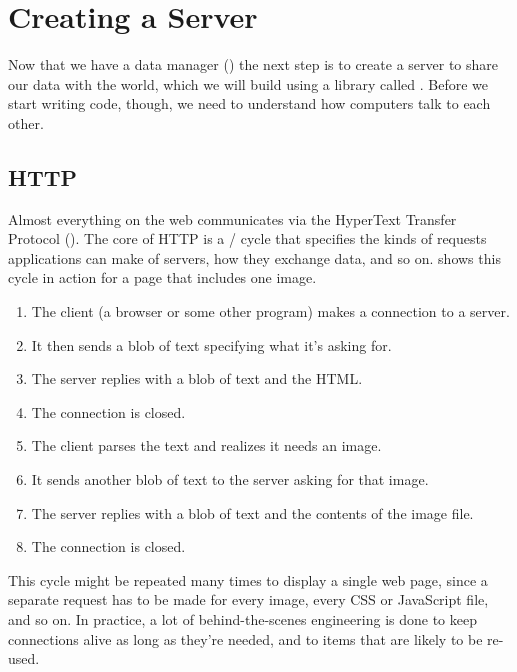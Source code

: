 \chapter{Creating a Server}\label{s:server}

Now that we have a data manager ()
the next step is to create a server to share our data with the world,
which we will build using a library called .
Before we start writing code,
though,
we need to understand how computers talk to each other.

\section{HTTP}\label{s:server-http}

Almost everything on the web communicates via the HyperText Transfer Protocol ().
The core of HTTP is a / cycle
that specifies the kinds of requests applications can make of servers,
how they exchange data,
and so on.
 shows this cycle in action for a page that includes one image.


\begin{enumerate}
\item
  The client (a browser or some other program) makes a connection to a server.
\item
  It then sends a blob of text specifying what it's asking for.
\item
  The server replies with a blob of text and the HTML.
\item
  The connection is closed.
\item
  The client parses the text and realizes it needs an image.
\item
  It sends another blob of text to the server asking for that image.
\item
  The server replies with a blob of text and the contents of the image file.
\item
  The connection is closed.
\end{enumerate}

This cycle might be repeated many times to display a single web page,
since a separate request has to be made for every image,
every CSS or JavaScript file,
and so on.
In practice,
a lot of behind-the-scenes engineering is done to keep connections alive as long as they're needed,
and to  items that are likely to be re-used.

